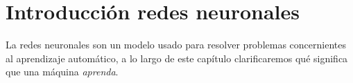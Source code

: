
\chapter{Introducción redes neuronales} 

La redes neuronales son un modelo usado para resolver problemas concernientes al aprendizaje automático, a lo largo de este capítulo clarificaremos qué significa 
que una máquina \textit{aprenda}. 

